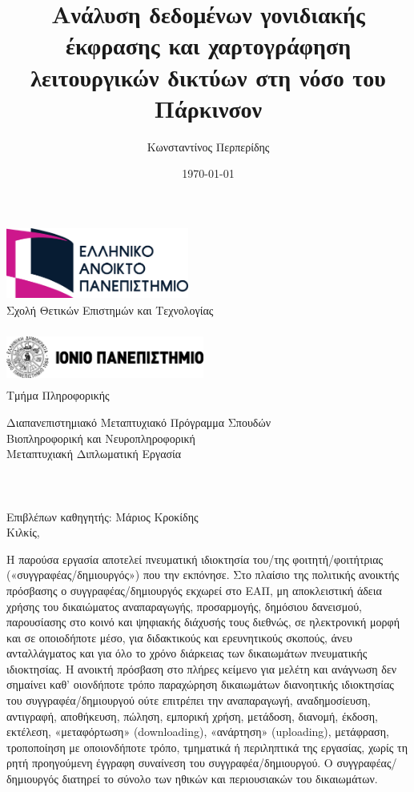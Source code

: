 \documentclass[12pt]{report}
\makeatletter
\newcommand{\frontmatter}{
    \cleardoublepage
    \pagenumbering{roman}
    \pagestyle{plain} %
    \setcounter{page}{1} %
}
\renewcommand{\maketitle}{
    \begin{titlepage}
        \noindent
        \begin{minipage}[t]{0.6\textwidth}
            \centering
            \includegraphics[height=2.4cm,width=6cm]{university1-logo.png}\\
            \fontsize{12pt}{14pt}\selectfont
            Σχολή Θετικών Επιστημών και Τεχνολογίας
        \end{minipage}
        \hfill
        \begin{minipage}[t]{0.4\textwidth}
            \centering
            \includegraphics[height=1.8cm,width=6.5cm]{university2-logo.png}\\
            \fontsize{12pt}{14pt}\selectfont
            Τμήμα Πληροφορικής
        \end{minipage}
        \vspace*{2cm}
        \begin{center}
            \fontsize{16pt}{14pt}\selectfont
            Διαπανεπιστημιακό Μεταπτυχιακό Πρόγραμμα Σπουδών\\[14pt]
            Βιοπληροφορική και Νευροπληροφορική\\[48pt]
            Μεταπτυχιακή Διπλωματική Εργασία\\[24pt]
    
            {\fontsize{16pt}{18pt}\selectfont\bfseries \@title\\[18pt]}
            {\large \@author\\[12pt]}\\[24pt]
            \fontsize{12pt}{14pt}\selectfont
            Επιβλέπων καθηγητής: Μάριος Κροκίδης\\
            \vspace{5cm}
            \fontsize{14pt}{16pt}\selectfont
            Κιλκίς, {\large \@date}
        \end{center}
    \end{titlepage}
}
\makeatother
\begin{document}
\frontmatter

\title{Ανάλυση δεδομένων γονιδιακής έκφρασης και χαρτογράφηση λειτουργικών δικτύων στη νόσο του Πάρκινσον}
\author{Κωνσταντίνος Περπερίδης}
\date{\today}
\maketitle
\thispagestyle{empty} 
\cleardoublepage
\thispagestyle{empty} 
\vspace*{\fill} %
\begin{center}
\fontsize{10pt}{12pt}\selectfont
\textcopyright
Η παρούσα εργασία αποτελεί πνευματική ιδιοκτησία του/της φοιτητή/φοιτήτριας («συγγραφέας/δημιουργός»)
που την εκπόνησε. Στο πλαίσιο της πολιτικής ανοικτής πρόσβασης ο συγγραφέας/δημιουργός εκχωρεί στο
ΕΑΠ, μη αποκλειστική άδεια χρήσης του δικαιώματος αναπαραγωγής, προσαρμογής, δημόσιου δανεισμού,
παρουσίασης στο κοινό και ψηφιακής διάχυσής τους διεθνώς, σε ηλεκτρονική μορφή και σε οποιοδήποτε
μέσο, για διδακτικούς και ερευνητικούς σκοπούς, άνευ ανταλλάγματος και για όλο το χρόνο διάρκειας των
δικαιωμάτων πνευματικής ιδιοκτησίας. Η ανοικτή πρόσβαση στο πλήρες κείμενο για μελέτη και ανάγνωση
δεν σημαίνει καθ’ οιονδήποτε τρόπο παραχώρηση δικαιωμάτων διανοητικής ιδιοκτησίας του
συγγραφέα/δημιουργού ούτε επιτρέπει την αναπαραγωγή, αναδημοσίευση, αντιγραφή, αποθήκευση, πώληση,
εμπορική χρήση, μετάδοση, διανομή, έκδοση, εκτέλεση, «μεταφόρτωση» (downloading), «ανάρτηση»
(uploading), μετάφραση, τροποποίηση με οποιονδήποτε τρόπο, τμηματικά ή περιληπτικά της εργασίας, χωρίς
τη ρητή προηγούμενη έγγραφη συναίνεση του συγγραφέα/δημιουργού. Ο συγγραφέας/δημιουργός διατηρεί
το σύνολο των ηθικών και περιουσιακών του δικαιωμάτων.
\end{center}
\vspace*{\fill} %
\clearpage
\end{document}
